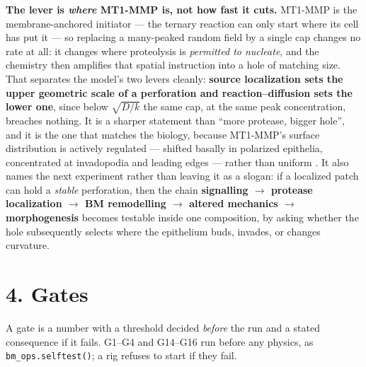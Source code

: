 \documentclass[10pt,a4paper]{article}
\newcommand{\code}[1]{\texttt{#1}}
\begin{document}
\textbf{The lever is \emph{where} MT1-MMP is, not how fast it cuts.} MT1-MMP is the membrane-anchored
initiator --- the ternary reaction can only start where its cell has put it --- so replacing a
many-peaked random field by a single cap changes no rate at all: it changes where proteolysis is
\emph{permitted to nucleate}, and the chemistry then amplifies that spatial instruction into a hole of
matching size. That separates the model's two levers cleanly: \textbf{source localization sets the
upper geometric scale of a perforation and reaction--diffusion sets the lower one}, since below
$\sqrt{D/k}$ the same cap, at the same peak concentration, breaches nothing. It is a sharper statement
than ``more protease, bigger hole'', and it is the one that matches the biology, because MT1-MMP's
surface distribution is actively regulated --- shifted basally in polarized epithelia, concentrated at
invadopodia and leading edges --- rather than uniform \cite{sato2010}. It also names the next
experiment rather than leaving it as a slogan: if a localized patch can hold a \emph{stable}
perforation, then the chain \textbf{signalling $\to$ protease localization $\to$ BM remodelling $\to$
altered mechanics $\to$ morphogenesis} becomes testable inside one composition, by asking whether the
hole subsequently selects where the epithelium buds, invades, or changes curvature.


\section*{4.\; Gates}


A gate is a number with a threshold decided \emph{before} the run and a stated consequence if it fails.
G1--G4 and G14--G16 run before any physics, as \code{bm\_ops.selftest()}; a rig refuses to start if they
fail.
\end{document}
